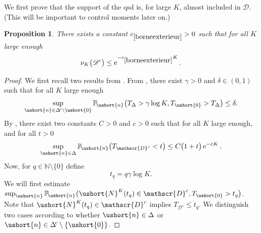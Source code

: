 \documentclass[JEP,XML,SOM,Unicode]{cedram}
\let\backslash\setminus
\let\mathcal\mathscr
\numberwithin{equation}{section}
\theoremstyle{plain}
\newtheorem{proposition}[theorem]{Proposition}
\theoremstyle{definition}
\newcommand{\pcte}[1]{c_{\eqref{#1}}}
\newcommand{\proba}{{\mathbb{P}}}
\newcommand{\integers}{\mathbb{N}}
\newcommand{\vecn}{\ushort{n}}
\newcommand{\veczer}{\ushort{0}}
\newcommand{\sDelta}{\Delta}
\newcommand{\leproc}{\ushort{N}^{K}}
\newcommand{\nuk}{\nu_{K}}\let\snuk\nuk
\newcommand{\e}{\operatorname{e}}
\begin{document}
We first prove that the support of the qsd is, for large $K$, almost included in $ \mathcal{D}$. (This will be important to control moments later on.)
\begin{proposition}\label{borneexterieur}
There exists a constant $\pcte{borneexterieur}>0$ such that for all $K$ large enough
\[
\nuk\bigl(\mathcal{D}^{c}\bigr)\le \e^{-\pcte{borneexterieur}K}.
\]
\end{proposition}
\begin{proof}
We first recall two results from \cite{ccm2}.
From \cite[Lem.\,1.5]{ccm2}, there exist $\gamma>0$ and $\delta\in(0,1)$ such that for all $K$ large enough
\begin{equation}\label{res1}
\sup_{\vecn\in\sDelta^{\!c}\backslash\veczer}\proba_{\!\vecn}\bigl(T_{\sDelta}>\gamma\log K,T_{\veczer}>T_{\sDelta}\bigr)\leq \delta.
\end{equation}
By \cite[Sublem.\,5.8]{ccm2}, there exist two constants $C>0$ and $c>0$ such that for all $K$ large enough, and for all $t>0$
\begin{equation}\label{res2}
\sup_{\vecn\in\Delta}\proba_{\!\vecn}\bigl(T_{ \mathcal{D}^{c}}<t\bigr)\leq C\bigl(1+t\bigr) \e^{-c K}.
\end{equation}
Now, for $q\in\integers\backslash \{0\}$ define
\[
t_{q}=q\gamma\log K.
\]
We will first estimate
$\sup_{\vecn}\proba_{\!\vecn}\bigl(\leproc(t_{q})\in \mathcal{D}^{c}, T_{\veczer}>t_q\bigr)$.
Note that $\leproc(t_{q})\in \mathcal{D}^{c}$ implies $T_{ \mathcal{D}^{c}}\leq t_{q}$.
We distinguish two cases according to whether $\vecn\in \Delta$ or $\vecn\in \Delta^{\!c}\backslash\{\veczer\}$.


\end{proof}
\end{document}
